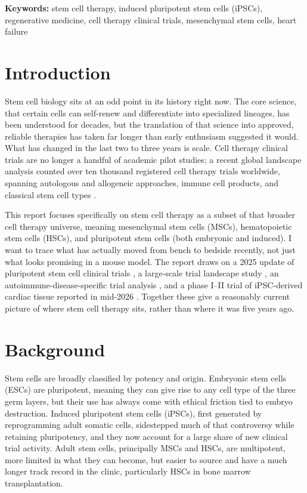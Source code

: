 \documentclass[11pt]{article}
\begin{document}
\vspace{0.5cm}
\noindent \textbf{Keywords:} stem cell therapy, induced pluripotent stem cells (iPSCs), regenerative medicine, cell therapy clinical trials, mesenchymal stem cells, heart failure

\section{Introduction}

Stem cell biology sits at an odd point in its history right now. The core science, that certain cells can self-renew and differentiate into specialized lineages, has been understood for decades, but the translation of that science into approved, reliable therapies has taken far longer than early enthusiasm suggested it would. What has changed in the last two to three years is scale. Cell therapy clinical trials are no longer a handful of academic pilot studies; a recent global landscape analysis counted over ten thousand registered cell therapy trials worldwide, spanning autologous and allogeneic approaches, immune cell products, and classical stem cell types \cite{panoramic2026}.

This report focuses specifically on stem cell therapy as a subset of that broader cell therapy universe, meaning mesenchymal stem cells (MSCs), hematopoietic stem cells (HSCs), and pluripotent stem cells (both embryonic and induced). I want to trace what has actually moved from bench to bedside recently, not just what looks promising in a mouse model. The report draws on a 2025 update of pluripotent stem cell clinical trials \cite{kirkeby2025}, a large-scale trial landscape study \cite{panoramic2026}, an autoimmune-disease-specific trial analysis \cite{autoimmune2025}, and a phase I--II trial of iPSC-derived cardiac tissue reported in mid-2026 \cite{biovat2026}. Together these give a reasonably current picture of where stem cell therapy sits, rather than where it was five years ago.

\section{Background}

Stem cells are broadly classified by potency and origin. Embryonic stem cells (ESCs) are pluripotent, meaning they can give rise to any cell type of the three germ layers, but their use has always come with ethical friction tied to embryo destruction. Induced pluripotent stem cells (iPSCs), first generated by reprogramming adult somatic cells, sidestepped much of that controversy while retaining pluripotency, and they now account for a large share of new clinical trial activity. Adult stem cells, principally MSCs and HSCs, are multipotent, more limited in what they can become, but easier to source and have a much longer track record in the clinic, particularly HSCs in bone marrow transplantation.
\end{document}
